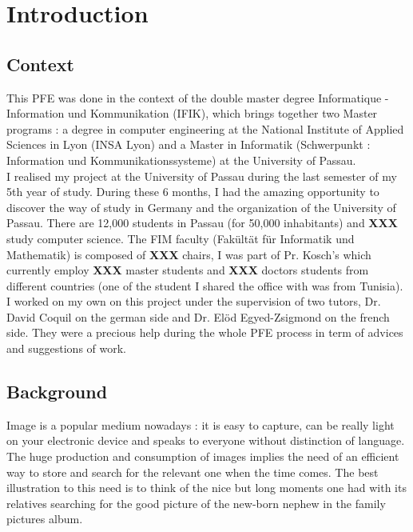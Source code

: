 \section{Introduction}
\subsection{Context} %
\label{sub:context}
This PFE was done in the context of the double master degree Informatique - Information und Kommunikation (IFIK), which brings together two Master programs : a degree in computer engineering at the National Institute of Applied Sciences in Lyon (INSA Lyon) and a Master in Informatik (Schwerpunkt : Information und Kommunikationssysteme) at the University of Passau.\\

I realised my project at the University of Passau during the last semester of my 5th year of study. During these 6 months, I had the amazing opportunity to discover the way of study in Germany and the organization of the University of Passau. There are 12,000 students in Passau (for 50,000 inhabitants) and \textbf{XXX} study computer science. The FIM faculty (Fakültät für Informatik und Mathematik) is composed of \textbf{XXX} chairs, I was part of Pr. Kosch's which currently employ \textbf{XXX} master students and \textbf{XXX} doctors students from different countries (one of the student I shared the office with was from Tunisia).\\

I worked on my own on this project under the supervision of two tutors, Dr. David Coquil on the german side and Dr. Elöd Egyed-Zsigmond on the french side. They were a precious help during the whole PFE process in term of advices and suggestions of work.

\subsection{Background} %
\label{sub:background}

Image is a popular medium nowadays : it is easy to capture, can be really light on your electronic device and speaks to everyone without distinction of language.\\

The huge production and consumption of images implies the need of an efficient way to store and search for the relevant one when the time comes. The best illustration to this need is to think of the nice but long moments one had with its relatives searching for the good picture of the new-born nephew in the family pictures album.\\

